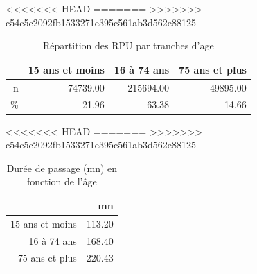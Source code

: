 \documentclass[12pt,english,french,twoside]{book}\usepackage[]{graphicx}\usepackage[]{color}
\begin{document}
<<<<<<< HEAD
=======
>>>>>>> c54c5c2092fb1533271e395c561ab3d562e88125
\begin{table}[ht]
\centering
\begin{tabular}{rrrr}
  \hline
 & 15 ans et moins & 16 à 74 ans & 75 ans et plus \\ 
  \hline
n & 74739.00 & 215694.00 & 49895.00 \\ 
  \% & 21.96 & 63.38 & 14.66 \\ 
   \hline
\end{tabular}
\caption[Répartition des RPU par tranches d'age]{Répartition des RPU par tranches d'age } 
\label{tab:tranches_age}
\end{table}




<<<<<<< HEAD
=======
>>>>>>> c54c5c2092fb1533271e395c561ab3d562e88125
\begin{table}[ht]
\centering
\begin{tabular}{rr}
  \hline
 & mn \\ 
  \hline
15 ans et moins & 113.20 \\ 
  16 à 74 ans & 168.40 \\ 
  75 ans et plus & 220.43 \\ 
   \hline
\end{tabular}
\caption[Durée de passage et age]{Durée de passage (mn) en fonction de l'âge} 
\label{tab:age_dp}
\end{table}
\end{document}
